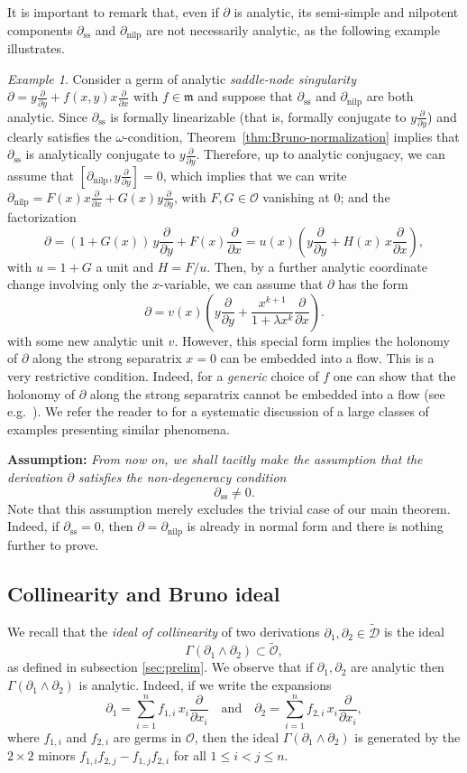 \documentclass[10pt,twoside,reqno]{amsart}
\theoremstyle{remark}
\theoremstyle{remark}
\newtheorem{example}[thm]{Example}
\newcommand{\xx}{\frac{\partial}{\partial x}}
\newcommand{\yy}{\frac{\partial}{\partial y}}
\newcommand{\tmem}[1]{{\em #1\/}}
\newcommand{\tmop}[1]{{\operatorname{#1}}}
\newcommand{\tO}{\widetilde{\mathcal{O}}}
\newcommand{\cD}{\mathcal{D}}
\newcommand{\tcD}{\widetilde{\cD}}
\newcommand{\vO}{\mathcal{O}}
\begin{document}
It is important to remark that, even if $\partial$ is analytic, its semi-simple and nilpotent components $\partial_{\tmop{ss}}$ and $\partial_{\tmop{nilp}}$ are not necessarily analytic, as the following example illustrates.
\begin{example}
    Consider a germ of analytic {\em saddle-node singularity} $\partial= y\yy + f(x,y)x \xx$ with $f\in \mathfrak{m}$ and suppose that $\partial_{\tmop{ss}}$ and $\partial_{\tmop{nilp}}$ are both analytic. Since $\partial_{\tmop{ss}}$ is formally linearizable (that is, formally conjugate to $y\yy$) and clearly satisfies the $\omega$-condition, Theorem~\ref{thm:Bruno-normalization} implies that $\partial_{\tmop{ss}}$ is analytically conjugate to $y\yy$. Therefore, up to analytic conjugacy, we can assume that $[\partial_{\tmop{nilp}}, y\yy]=0$, which implies that we can write $\partial_{\tmop{nilp}}= F(x) x \xx + G(x) y \yy$, with $F,G\in \vO$ vanishing at $0$; and the factorization
 $$
 \partial = (1+G(x))\, y\yy + F(x) \xx = u(x) \left( y\yy + H(x)\, x\xx\right),
 $$
with $u=1+G$ a unit and $H=F/u$. Then, by a further analytic coordinate change involving only the $x$-variable, we can assume that $\partial$ has the form
    $$  \partial= v(x)\left( y\yy + \frac{x^{k+1}}{1+\lambda x^k} \xx\right).$$
with some new analytic unit $v$. However, this special form implies the holonomy of $\partial$ along the strong separatrix $x=0$ can be embedded into a flow. This is a very restrictive condition.  Indeed, for a {\em generic} choice of $f$ one can show that the holonomy of $\partial$ along the strong separatrix cannot be embedded into a flow (see e.g.~\cite{Martinet-Ramis1983}). We refer the reader to \cite{Elizarov1985} for a systematic discussion of a large classes of examples presenting similar phenomena.
\end{example}
{\bf Assumption:} {\em From now on, we shall tacitly make the assumption that the derivation $\partial$ satisfies the {\em non-degeneracy condition} }
$$\partial_{\tmop{ss}} \ne 0.$$
Note that this assumption merely excludes the trivial case of our main theorem. Indeed, if $\partial_{\tmop{ss}} = 0$, then $\partial = \partial_{\tmop{nilp}}$ is already in normal form and there is nothing further to prove.\subsection{Collinearity and Bruno ideal}\label{def-collinearity-id}
We recall that the {\tmem{ideal of collinearity}} of two derivations $\partial_1,
  \partial_2 \in \tcD$ is the ideal 
  $$\Gamma (\partial_1 \wedge \partial_2) \subset
  \tO,$$
  as defined in subsection \ref{sec:prelim}. We observe that if $\partial_1,\partial_2$ are analytic then $\Gamma (\partial_1 \wedge \partial_2)$ is analytic. Indeed, if we write the expansions
$$
\partial_1 = \sum_{i=1}^n f_{1,i}\, x_i \frac{\partial}{\partial x_i} \quad \text{and} \quad \partial_2 = \sum_{i=1}^n f_{2,i} \, x_i \frac{\partial}{\partial x_i},
$$
where $f_{1,i}$ and $f_{2,i}$ are germs in $\vO$, then the ideal $\Gamma (\partial_1 \wedge \partial_2)$ is generated by the $2 \times 2$ minors $f_{1,i} f_{2,j} - f_{1,j} f_{2,i}$ for all $1 \le i < j \le n$.
  
\end{document}
